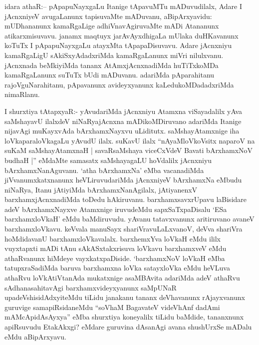 
\begin{artha}
idara athaR:-- pApapuNayxgaLu Itanige tApavuMTu mADuvudilalx, Adare I jAcnxniyeV avugaLanunx tapisuvaMte mADuvanu, aBipArxyavidu: mUDhananunx kamaRgaLige adhiVnavAgiruvaMte mADi Atananunx atikarxmisuvavu. janamx maqtuyx jarAvAyxdhigaLa mUlaka duHKavanunx koTuTx I pApapuNayxgaLu atayxMta tApapaDisuvavu. Adare jAcnxniyu kamaRgaLigU sAkiSxyAdadxriMda kamaRgaLanunx miVri nilulxvanu. jAcnxnada beMkiyiMda tananx AtAmxjAcnxnadiMda huTiTxkoMDa kamaRgaLanunx suTuTx bUdi mADuvanu. adariMda pAparahitanu rajoVguNarahitanu, pApavanunx avideyxyanunx kaLedukoMDadadxriMda nimaRlanu.
\end{artha}


\begin{artha}
I shurxtiya tAtapxyaR:- yAvudariMda jAcnxniyu Atamxna viSayadalilx yAva saMshayavU ilalxdeV niNaRyajAcnxna mADikoMDiruvano adariMda Itanige nijavAgi muKayxvAda bArxhamxNayxvu uLiditutx. saMshayAtamxnige iha loVkaparaloVkagaLu yAvudU ilalx. suKavU ilalx ``nAyaMloVkoVsitx naparoV na suKaM saMshayAtamxnaH | savaRsaMshaya viceCxVdeV Bavati bArxhamxNoV budhaH |'' eMdaMte samasatx saMshayagaLU hoVdalilx jAcnxniyu bArxhamxNanAguvanu. `atha bArxhamxNa' eMba vacanadiMda jiVvanumxkatxnanunx heVLiruvudariMda jAcnxniyeV bArxhamxNa eMbudu niNaRya, Itanu jAtiyiMda bArxhamxNanAgilalx, jAtiyanenxV barxhamxjAcnxnadiMda toDedu hAkiruvanu. barxhamxsavxrUpavu laBisidare adeV bArxhamxNayxve Atamxnige iruvudeMdu sapxSaTxpaDisalu `ESa barxhamxloVkaH' eMdu baMdiruvudu. yAvanu tatavxvanunx aritiruvano avaneV barxhamxloVkavu. keVvala manuSayx shariVravuLaLxvanoV, deVva shariVra hoMdidavanU barxhamxloVkavalalx. barxhemxYva loVkaH eMdu ililx vuyxtapxti mADi tAnu sAkASxtakxrisuva loVkavu barxhamxveV eMdu athaRvanunx hiMdeye vayxkatxpaDiside. `barxhamxNoV loVkaH eMba tatupxraSadiMda baruva barxhamxna loVka satayxloVka eMdu heVLuva athaRvu loVkAtiVtanAda mukatxnige asaMBAvita adariMda adeV athaRvu sAdhanasahitavAgi barxhamxvideyxyanunx saMpUNaR upadeVshisidAdxyiteMdu tiLidu janakanu tananx deVhavanunx rAjayxvanunx guruvige samapiRsidaneMdu ``soV\s haM BagavateV videVhAnf dadAmi mAMcApidAsAyxya'' eMba shurxtiya koneyalilx tiLidu baMdide, tananxnunx apiRsuvudu EtakAkxgi? eMdare guruvina dAsanAgi avana shushUrxSe mADalu eMdu aBipArxyavu.
\end{artha}

